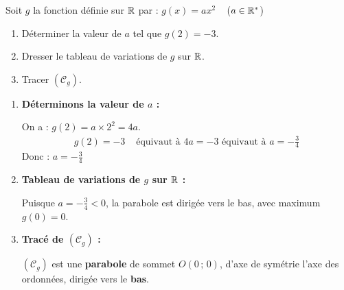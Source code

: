 \documentclass[10pt, a4paper]{article}
\begin{document}
\begin{Application}[][25 min]
Soit $g$ la fonction définie sur $\mathbb{R}$ par : $g(x) = ax^2$  ~ ($a \in \mathbb{R}^*$)
\begin{enumerate}[leftmargin=*,itemsep=0.5pt]
    \item Déterminer la valeur de $a$ tel que $g(2) = -3$.
    \item Dresser le tableau de variations de $g$ sur $\mathbb{R}$.
    \item Tracer $(\mathcal{C}_g)$.
\end{enumerate}
\end{Application}

\begin{Solution}[APPLICATION][19]
\begin{enumerate}[leftmargin=*,itemsep=0.5pt]
    \item \textbf{Déterminons la valeur de $a$ :}

    On a : $g(2) = a \times 2^2 = 4a$.
    \begin{align*}
        g(2) = -3 &\text{ équivaut à } 4a = -3 \text{ équivaut à } a = -\frac{3}{4}
    \end{align*}
    Donc : \quad $a = -\frac{3}{4}$

    \item \textbf{Tableau de variations de $g$ sur $\mathbb{R}$ :}

    Puisque $a = -\frac{3}{4} < 0$, la parabole est dirigée vers le bas, avec maximum $g(0) = 0$.
    \begin{center}
    \end{center}

    \item \textbf{Tracé de $(\mathcal{C}_g)$ :}

    $(\mathcal{C}_g)$ est une \textbf{parabole} de sommet $O(0\,;\,0)$, d'axe de symétrie l'axe des ordonnées, dirigée vers le \textbf{bas}.
\begin{center}
\end{center}
\end{enumerate}
\end{Solution}
\end{document}
